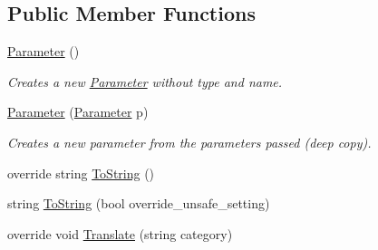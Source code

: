 \subsection*{Public Member Functions}
\begin{DoxyCompactItemize}
\item 
\hyperlink{class_bind_1_1_structures_1_1_parameter_ab86b12758f40cd171d5ccd4614b86258}{Parameter} ()
\begin{DoxyCompactList}\small\item\em Creates a new \hyperlink{class_bind_1_1_structures_1_1_parameter}{Parameter} without type and name. \item\end{DoxyCompactList}\item 
\hyperlink{class_bind_1_1_structures_1_1_parameter_a3a3da0762e5b37f14151af6348992abd}{Parameter} (\hyperlink{class_bind_1_1_structures_1_1_parameter}{Parameter} p)
\begin{DoxyCompactList}\small\item\em Creates a new parameter from the parameters passed (deep copy). \item\end{DoxyCompactList}\item 
override string \hyperlink{class_bind_1_1_structures_1_1_parameter_a02456a6db10150f1edd94bcc8c626646}{ToString} ()
\item 
string \hyperlink{class_bind_1_1_structures_1_1_parameter_a6cfe5550da825164f5c1e50f94f2c1d0}{ToString} (bool override\_\-unsafe\_\-setting)
\item 
override void \hyperlink{class_bind_1_1_structures_1_1_parameter_ad2d695a3f48a7464e447b08e9ae350fb}{Translate} (string category)
\end{DoxyCompactItemize}
